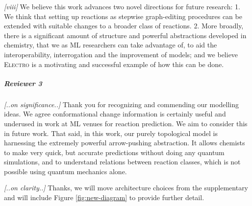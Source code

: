 \documentclass{article}
\newcommand{\ourModel}{\textsc{Electro}\xspace}
\begin{document}
\emph{[viii]}
We believe this work advances two novel directions for future research: 
  1. We think that setting up reactions as stepwise graph-editing procedures can be extended with suitable changes to a broader class of reactions.
 2. More broadly, there is a significant amount of structure and powerful abstractions developed in chemistry, that we as ML researchers can take advantage of, to aid the interoperability, interrogation and the improvement of  models;
and we believe \ourModel is a motivating and successful example of how this can be done.





 
 
 



\vspace{-5pt}
\subparagraph*{Reviewer 3}
\emph{[..on significance..]}
Thank you for recognizing and commending our modelling ideas. We agree conformational change information is certainly useful and underused in work at ML venues for reaction prediction. We aim to consider this in future work.
That said, in this work, our purely topological model is harnessing the extremely powerful arrow-pushing abstraction. 
It allows chemists to make very quick, but accurate predictions without doing any quantum simulations, and to understand relations between reaction classes, which is not possible using quantum mechanics alone. 

\emph{[..on clarity..]}
Thanks, we will move architecture choices from the supplementary and will include Figure \ref{fig:new-diagram} to provide further detail.
\end{document}
